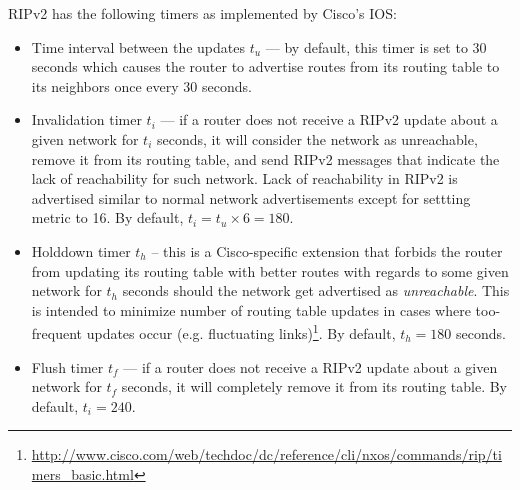 \documentclass[pdftex,12pt,a4paper]{article}
\begin{document}
        RIPv2 has the following timers as implemented by Cisco's IOS:
        \begin{itemize}
            \item Time interval between the updates $t_u$ --- by default, this timer
                is set to 30 seconds which causes the router to advertise routes from
                its routing table to its neighbors once every 30 seconds.
            \item Invalidation timer $t_i$ --- if a router does not receive a
                RIPv2 update about a given network for $t_i$ seconds, it will
                consider the network as unreachable, remove it from its routing
                table, and send RIPv2 messages that indicate the lack of
                reachability for such network. Lack of reachability in RIPv2 is
                advertised similar to normal network advertisements except for
                settting metric to 16. By default, $t_i = t_u \times 6 = 180$.
            \item Holddown timer $t_h$ -- this is a Cisco-specific extension
                that forbids the router from updating its routing table with
                better routes with regards to some given network for $t_h$
                seconds should the network get advertised as
                \emph{unreachable}. This is intended to minimize number of
                routing table updates in cases where too-frequent updates occur
                (e.g. fluctuating
                links)\footnote{\url{http://www.cisco.com/web/techdoc/dc/reference/cli/nxos/commands/rip/timers\_basic.html}}.
                By default, $t_h = 180$ seconds.
            \item Flush timer $t_f$ --- if a router does not receive a
                RIPv2 update about a given network for $t_f$ seconds, it will
                completely remove it from its routing table. By default, $t_i = 240$.
        \end{itemize}
\end{document}
